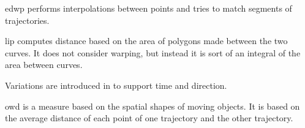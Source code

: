 
\gls{edwp} \cite{ranu2015indexing} performs interpolations between points and tries to match segments of trajectories. 


\gls{lip} \cite{pelekis2007similarity} computes distance based on the area of polygons made between the two curves. It does not consider warping, but instead it is sort of an integral of the area between curves.

Variations are introduced in \cite{pelekis2007similarity} to support time and direction.


\gls{owd} \cite{lin2005shapes} is a measure based on the spatial shapes of moving objects. It is based on the average distance of each point of one trajectory and the other trajectory.
